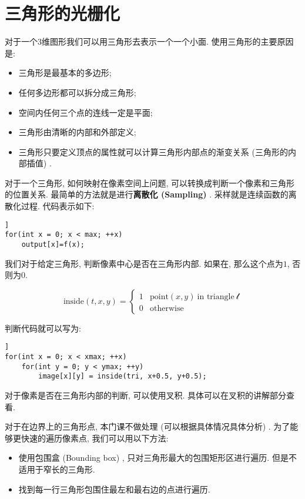\section{三角形的光栅化}

对于一个$3$维图形我们可以用三角形去表示一个一个小面. 使用三角形的主要原因是: 

\begin{itemize}[itemsep=-0.5em]
	\item 三角形是最基本的多边形; 
	\item 任何多边形都可以拆分成三角形; 
	\item 空间内任何三个点的连线一定是平面; 
	\item 三角形由清晰的内部和外部定义; 
	\item 三角形只要定义顶点的属性就可以计算三角形内部点的渐变关系 (三角形的内部插值) . 
\end{itemize}

对于一个三角形, 如何映射在像素空间上问题, 可以转换成判断一个像素和三角形的位置关系. 最简单的方法就是进行\textbf{离散化 (Sampling) }. 采样就是连续函数的离散化过程. 代码表示如下: 

\begin{lstlisting}]
for(int x = 0; x < max; ++x)
	output[x]=f(x);
\end{lstlisting}
我们对于给定三角形, 判断像素中心是否在三角形内部. 如果在, 那么这个点为$1$, 否则为$0$.

\begin{equation}
	\text{inside}(t, x, y)=\left\{\begin{matrix}
		1 & \text{point}(x,y)\ \text{in triangle}\ \mathcal{t}\\ 
		0 & \text{otherwise}
	\end{matrix}\right.
\end{equation}

判断代码就可以写为: 
\begin{lstlisting}]
for(int x = 0; x < xmax; ++x)
	for(int y = 0; y < ymax; ++y)
		image[x][y] = inside(tri, x+0.5, y+0.5);
\end{lstlisting}

对于像素是否在三角形内部的判断, 可以使用叉积. 具体可以在叉积的讲解部分查看. 

对于在边界上的三角形点, 本门课不做处理 (可以根据具体情况具体分析) . 为了能够更快速的遍历像素点, 我们可以用以下方法: 

\begin{itemize}[itemsep=-0.5em]
	\item 使用包围盒 (Bounding box) , 只对三角形最大的包围矩形区进行遍历. 但是不适用于窄长的三角形. 
	\item 找到每一行三角形包围住最左和最右边的点进行遍历. 
\end{itemize}

